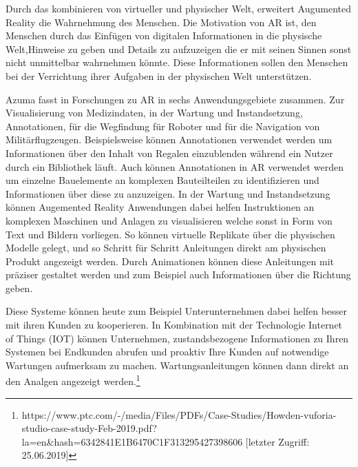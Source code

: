 \cite{Azuma.1997} Durch das kombinieren von virtueller und physischer Welt, erweitert Augumented Reality die Wahrnehmung des Menschen. Die Motivation von AR ist, den Menschen durch das Einfügen
von digitalen Informationen in die physische Welt,Hinweise zu geben und Details zu aufzuzeigen die er mit seinen Sinnen sonst nicht unmittelbar wahrnehmen könnte. Diese Informationen sollen den Menschen 
bei der Verrichtung ihrer Aufgaben in der physischen Welt unterstützen.

Azuma fasst in \cite{Azuma.1997}  Forschungen zu AR in sechs Anwendungsgebiete zusammen. Zur Visualisierung von Medizindaten, in der Wartung 
und Instandsetzung, Annotationen, für die Wegfindung für Roboter und für die Navigation von Militärflugzeugen. Beispielsweise können Annotationen 
verwendet werden um Informationen über den Inhalt von Regalen einzublenden während ein Nutzer durch ein Bibliothek läuft. %
Auch können Annotationen in AR verwendet werden um einzelne Bauelemente an komplexen Bauteilteilen zu identifizieren und Informationen über diese zu anzuzeigen. 
In der Wartung und Instandsetzung können Augemented Reality Anwendungen dabei helfen Instruktionen an komplexen Maschinen und Anlagen zu visualisieren welche sonst in 
Form von Text und Bildern vorliegen. So können virtuelle Replikate über die physischen Modelle gelegt, und so Schritt für Schritt Anleitungen direkt am physischen Produkt angezeigt werden. 
Durch Animationen können diese Anleitungen mit präziser gestaltet werden und zum Beispiel auch Informationen über die Richtung geben. 

Diese Systeme können heute zum Beispiel Unterunternehmen dabei helfen besser mit ihren Kunden zu kooperieren. In Kombination mit der Technologie Internet of Things (IOT) können Unternehmen,
zustandsbezogene Informationen zu Ihren Systemen bei Endkunden abrufen und proaktiv Ihre Kunden auf notwendige Wartungen aufmerksam zu machen. Wartungsanleitungen können dann direkt 
an den Analgen angezeigt werden.\footnote[2]{ https://www.ptc.com/-/media/Files/PDFs/Case-Studies/Howden-vuforia-studio-case-study-Feb-2019.pdf?la=en\&hash=6342841E1B6470C1F313295427398606 [letzter Zugriff: 25.06.2019]}

